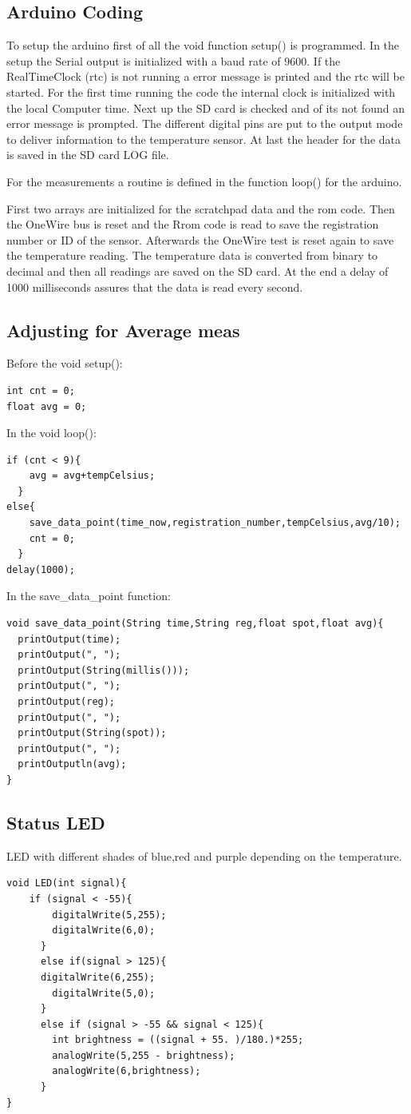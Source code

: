 \subsection{Arduino Coding}
To setup the arduino first of all the void function setup() is programmed.
In the setup the Serial output is initialized with a baud rate of 9600.
If the RealTimeClock (rtc) is not running a error message is printed and the rtc will be started.
For the first time running the code the internal clock is initialized with the local Computer time.
Next up the SD card is checked and of its not found an error message is prompted.
The different digital pins are put to the output mode to deliver information to the temperature sensor.
At last the header for the data is saved in the SD card LOG file.

For the measurements a routine is defined in the function loop() for the arduino.

First two arrays are initialized for the scratchpad data and the rom code.
Then the OneWire bus is reset and the Rrom code is read to save the registration number or ID of the sensor.
Afterwards the OneWire test is reset again to save the temperature reading.
The temperature data is converted from binary to decimal and then all readings are saved on the SD card.
At the end a delay of 1000 milliseconds assures that the data is read every second.
\subsection{Adjusting for Average meas}
Before the void setup():
\begin{lstlisting}
int cnt = 0;
float avg = 0;
\end{lstlisting}
In the void loop():
\begin{lstlisting}
if (cnt < 9){
    avg = avg+tempCelsius;
  }
else{
    save_data_point(time_now,registration_number,tempCelsius,avg/10);
    cnt = 0;
  }
delay(1000);
\end{lstlisting}
In the save\_data\_point function:

\begin{lstlisting}
void save_data_point(String time,String reg,float spot,float avg){
  printOutput(time);
  printOutput(", ");
  printOutput(String(millis()));
  printOutput(", ");
  printOutput(reg);
  printOutput(", ");
  printOutput(String(spot));
  printOutput(", ");
  printOutputln(avg);
}
\end{lstlisting}

\subsection{Status LED}
LED with different shades of blue,red and purple depending on the temperature.
\begin{lstlisting}
void LED(int signal){
    if (signal < -55){
        digitalWrite(5,255);
        digitalWrite(6,0);
      }
      else if(signal > 125){
      digitalWrite(6,255);
        digitalWrite(5,0);
      }
      else if (signal > -55 && signal < 125){
        int brightness = ((signal + 55. )/180.)*255;
        analogWrite(5,255 - brightness);
        analogWrite(6,brightness);
      }
}
\end{lstlisting}